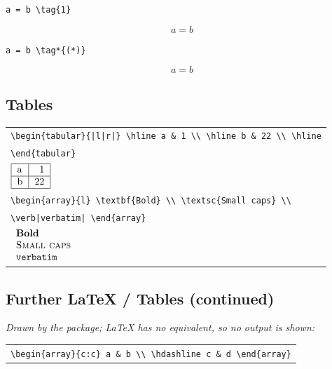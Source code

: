 \documentclass[9pt]{extarticle}
\begin{document}
{\small\verb|a = b \tag{1}|}

\[a = b \tag{1}\]

{\small\verb|a = b \tag*{(*)}|}

\[a = b \tag*{(*)}\]

\subsection*{Tables}

\begin{tabular}{@{}l@{}}
{\small\verb!\begin{tabular}{|l|r|} \hline a & 1 \\ \hline b & 22 \\ \hline!} \\ {\small\verb|\end{tabular}|} \\ {\large $\begin{tabular}{|l|r|} \hline a & 1 \\ \hline b & 22 \\ \hline \end{tabular}
$} \\[4pt]
{\small\verb|\begin{array}{l} \textbf{Bold} \\ \textsc{Small caps} \\|} \\ {\small\verb!\verb|verbatim| \end{array}!} \\ {\large $\begin{array}{l} \textbf{Bold} \\ \textsc{Small caps} \\ \verb|verbatim| \end{array}
$} \\[4pt]
\end{tabular}

\newpage
\subsection*{Further LaTeX / Tables (continued)}

{\small\itshape Drawn by the package; LaTeX has no equivalent, so no output is shown:}

\begin{tabular}{@{}l@{}}
{\small\verb|\begin{array}{c:c} a & b \\ \hdashline c & d \end{array}|} \\
\end{tabular}
\end{document}

